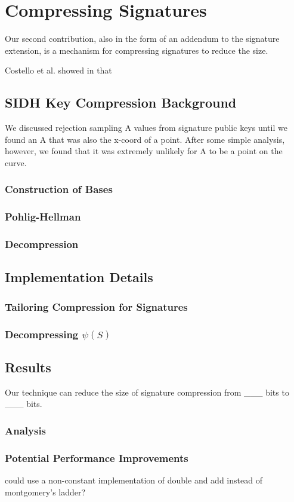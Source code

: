 \chapter{Compressing Signatures}
\label{sec:compress}

Our second contribution, also in the form of an addendum to the \sidh signature extension, is a mechanism for compressing signatures to reduce the size.

Costello et al. showed in \cite{pkcomp} that  

\section{SIDH Key Compression Background}

We discussed rejection sampling A values from signature public keys until we found an A that was also the x-coord of a point. After some simple analysis, however, we found that it was extremely unlikely for A to be a point on the curve.

\subsection{Construction of Bases}

\subsection{Pohlig-Hellman}

\subsection{Decompression}

\section{Implementation Details}

\subsection{Tailoring Compression for Signatures}

\subsection{Decompressing $\psi(S)$}

\section{Results}

Our technique can reduce the size of \sidh signature compression from \_\_\_ bits to \_\_\_ bits.

\subsection{Analysis}

\subsection{Potential Performance Improvements}

could use a non-constant implementation of double and add instead of montgomery's ladder? 

